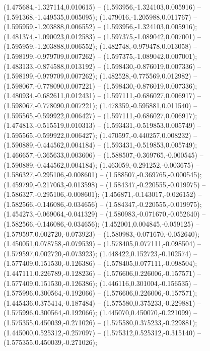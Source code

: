  (1.475684,-1.327114,0.010615) -- (1.593956,-1.324103,0.005916) -- (1.591368,-1.449535,0.005095);
 (1.479016,-1.205988,0.011767) -- (1.595959,-1.203888,0.006552) -- (1.593956,-1.324103,0.005916);
 (1.481374,-1.090023,0.012583) -- (1.597375,-1.089042,0.007001) -- (1.595959,-1.203888,0.006552);
 (1.482748,-0.979478,0.013058) -- (1.598199,-0.979709,0.007262) -- (1.597375,-1.089042,0.007001);
 (1.483133,-0.874588,0.013192) -- (1.598430,-0.876019,0.007336) -- (1.598199,-0.979709,0.007262);
 (1.482528,-0.775569,0.012982) -- (1.598067,-0.778090,0.007221) -- (1.598430,-0.876019,0.007336);
 (1.480934,-0.682611,0.012431) -- (1.597111,-0.686027,0.006917) -- (1.598067,-0.778090,0.007221);
 (1.478359,-0.595881,0.011540) -- (1.595565,-0.599922,0.006427) -- (1.597111,-0.686027,0.006917);
 (1.474813,-0.515519,0.010313) -- (1.593431,-0.519853,0.005749) -- (1.595565,-0.599922,0.006427);
 (1.470597,-0.440257,0.008232) -- (1.590889,-0.444562,0.004184) -- (1.593431,-0.519853,0.005749);
 (1.466657,-0.365633,0.003606) -- (1.588507,-0.369765,-0.000545) -- (1.590889,-0.444562,0.004184);
 (1.463059,-0.291252,-0.003675) -- (1.586327,-0.295106,-0.008601) -- (1.588507,-0.369765,-0.000545);
 (1.459799,-0.217063,-0.013598) -- (1.584347,-0.220555,-0.019975) -- (1.586327,-0.295106,-0.008601);
 (1.456871,-0.143017,-0.026152) -- (1.582566,-0.146086,-0.034656) -- (1.584347,-0.220555,-0.019975);
 (1.454273,-0.069064,-0.041329) -- (1.580983,-0.071670,-0.052640) -- (1.582566,-0.146086,-0.034656);
 (1.452001,0.004845,-0.059125) -- (1.579597,0.002720,-0.073923) -- (1.580983,-0.071670,-0.052640);
 (1.450051,0.078758,-0.079539) -- (1.578405,0.077111,-0.098504) -- (1.579597,0.002720,-0.073923);
 (1.448422,0.152723,-0.102574) -- (1.577409,0.151530,-0.126386) -- (1.578405,0.077111,-0.098504);
 (1.447111,0.226789,-0.128236) -- (1.576606,0.226006,-0.157571) -- (1.577409,0.151530,-0.126386);
 (1.446116,0.301004,-0.156535) -- (1.575996,0.300564,-0.192066) -- (1.576606,0.226006,-0.157571);
 (1.445436,0.375414,-0.187484) -- (1.575580,0.375233,-0.229881) -- (1.575996,0.300564,-0.192066);
 (1.445070,0.450070,-0.221099) -- (1.575355,0.450039,-0.271026) -- (1.575580,0.375233,-0.229881);
 (1.445000,0.525312,-0.257097) -- (1.575312,0.525312,-0.315140) -- (1.575355,0.450039,-0.271026);
